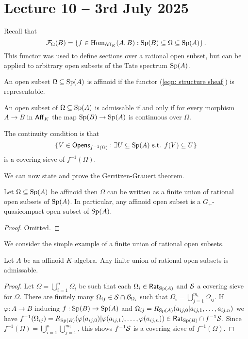 \section{Lecture 10 -- 3rd July 2025}\label{sec: lecture 10}
Recall that 
\begin{equation}\label{eqn: structure sheaf}
    \mathcal{F}_{\Omega}(B)=\left\{f\in\mathrm{Hom}_{\mathsf{Aff}_{K}}(A,B):\mathrm{Sp}(B)\subseteq\Omega\subseteq\mathrm{Sp}(A)\right\}.
\end{equation}
This functor was used to define sections over a rational open subset, but can be applied to arbitrary open subsets of the Tate spectrum $\mathrm{Sp}(A)$. 
\begin{definition}\label{def: affinoid open subset}
    An open subset $\Omega\subseteq\mathrm{Sp}(A)$ is affinoid if the functor (\ref{eqn: structure sheaf}) is representable.
\end{definition}
\begin{definition}\label{def: admissable open subset}
    An open subset of $\Omega\subseteq\mathrm{Sp}(A)$ is admissable if and only if for every morphism $A\to B$ in $\mathsf{Aff}_{K}$ the map $\mathrm{Sp}(B)\to\mathrm{Sp}(A)$ is continuous over $\Omega$. 
\end{definition}
\begin{remark}
    The continuity condition is that 
    $$\{V\in\mathsf{Opens}_{f^{-1}(\Omega)}:\exists U\subseteq \mathrm{Sp}(A)\text{ s.t. }f(V)\subseteq U\}$$ 
    is a covering sieve of $f^{-1}(\Omega)$. 
\end{remark}
We can now state and prove the Gerritzen-Grauert theorem. 
\begin{theorem}\label{thm: GG thm}
    Let $\Omega\subseteq\mathrm{Sp}(A)$ be affinoid then $\Omega$ can be written as a finite union of rational open subsets of $\mathrm{Sp}(A)$. In particular, any affinoid open subset is a $G_{+}$-quasicompact open subset of $\mathrm{Sp}(A)$.
\end{theorem}
\begin{proof}
    Omitted. 
\end{proof}
We consider the simple example of a finite union of rational open subsets. 
\begin{proposition}\label{prop: finite union of rationals is admissable}
    Let $A$ be an affinoid $K$-algebra. Any finite union of rational open subsets is admissable. 
\end{proposition}
\begin{proof}
    Let $\Omega=\bigcup_{i=1}^{n}\Omega_{i}$ be such that each $\Omega_{i}\in\mathsf{Rat}_{\mathrm{Sp}(A)}$ and $\mathcal{S}$ a covering sieve for $\Omega$. There are finitely many $\Omega_{ij}\in\mathcal{S}\cap\mathcal{B}_{\Omega_{i}}$ such that $\Omega_{i}=\bigcup_{j=1}^{m_{i}}\Omega_{ij}$. If $\varphi:A\to B$ inducing $f:\mathrm{Sp}(B)\to\mathrm{Sp}(A)$ and $\Omega_{ij}=R_{\mathrm{Sp}(A)}(a_{ij,0}|a_{ij,1},\dots,a_{ij,n})$ we have $f^{-1}(\Omega_{ij})=R_{\mathrm{Sp}(B)}(\varphi(a_{ij,0})|\varphi(a_{ij,1}),\dots,\varphi(a_{ij,n}))\in\mathsf{Rat}_{\mathrm{Sp}(B)}\cap f^{-1}\mathcal{S}$. Since $f^{-1}(\Omega)=\bigcup_{i=1}^{n}\bigcup_{j=1}^{m_{i}}$, this shows $f^{-1}\mathcal{S}$ is a covering sieve of $f^{-1}(\Omega)$. 
\end{proof}
